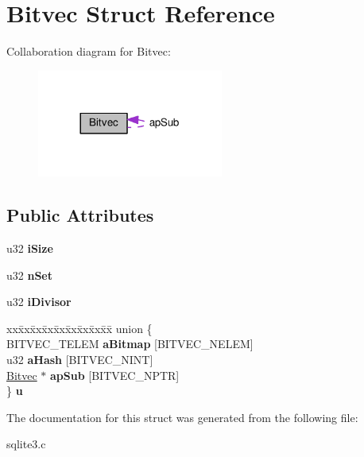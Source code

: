 \hypertarget{structBitvec}{}\section{Bitvec Struct Reference}
\label{structBitvec}


Collaboration diagram for Bitvec\+:\nopagebreak
\begin{figure}[H]
\begin{center}
\leavevmode
\includegraphics[width=173pt]{structBitvec__coll__graph}
\end{center}
\end{figure}
\subsection*{Public Attributes}
\begin{DoxyCompactItemize}
\item 
u32 {\bfseries i\+Size}\hypertarget{structBitvec_ab36df8ece98aee080bae6de28c237de8}{}\label{structBitvec_ab36df8ece98aee080bae6de28c237de8}

\item 
u32 {\bfseries n\+Set}\hypertarget{structBitvec_ad6811debae9b972f2d94d667e994e3f6}{}\label{structBitvec_ad6811debae9b972f2d94d667e994e3f6}

\item 
u32 {\bfseries i\+Divisor}\hypertarget{structBitvec_a22cdb23eb424e07b6ce922de018a83d9}{}\label{structBitvec_a22cdb23eb424e07b6ce922de018a83d9}

\item 
\begin{tabbing}
xx\=xx\=xx\=xx\=xx\=xx\=xx\=xx\=xx\=\kill
union \{\\
\>BITVEC\_TELEM {\bfseries aBitmap} \mbox{[}BITVEC\_NELEM\mbox{]}\\
\>u32 {\bfseries aHash} \mbox{[}BITVEC\_NINT\mbox{]}\\
\>\hyperlink{structBitvec}{Bitvec} $\ast$ {\bfseries apSub} \mbox{[}BITVEC\_NPTR\mbox{]}\\
\} {\bfseries u}\hypertarget{structBitvec_a580a692d761462ea1576d1fdcb6d97fa}{}\label{structBitvec_a580a692d761462ea1576d1fdcb6d97fa}
\\

\end{tabbing}\end{DoxyCompactItemize}


The documentation for this struct was generated from the following file\+:\begin{DoxyCompactItemize}
\item 
sqlite3.\+c\end{DoxyCompactItemize}
